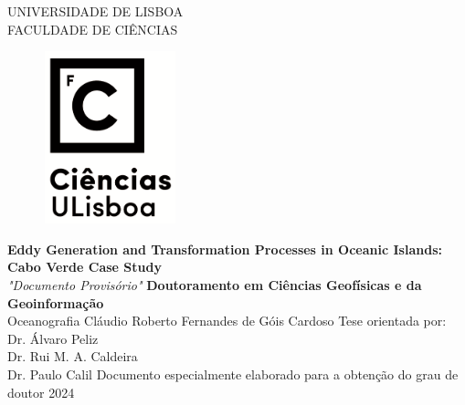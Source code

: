 \begin{titlepage}
	\centering
	UNIVERSIDADE DE LISBOA\\
	FACULDADE DE CIÊNCIAS\\
	\vfill
	\begin{figure}[h]
		\centering
		\includegraphics[width = 3.84cm,height = 5.00cm]{images/logo_vertical.png}
	\end{figure}
	
	\vfill
	\fontsize{12.2}{14.4}\selectfont \textbf{Eddy Generation and Transformation Processes in Oceanic Islands: Cabo Verde Case Study}\\
	\vfill
	\textit{"Documento Provisório"}
	\vfill
	\textbf{Doutoramento em Ciências Geofísicas e da Geoinformação}\\
	Oceanografia
	\vfill
	Cláudio Roberto Fernandes de Góis Cardoso
	\vfill
	\fontsize{12}{14.4}\selectfont Tese orientada por:\\
	Dr. Álvaro Peliz\\
	Dr. Rui M. A. Caldeira \\
	Dr. Paulo Calil
	\vfill
	Documento especialmente elaborado para a obtenção do grau de doutor
	\vfill
	\fontsize{14}{12}2024\\
\end{titlepage}

